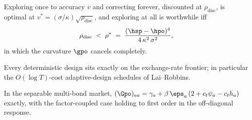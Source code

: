 \begin{theorem}
Exploring once to accuracy $v$ and correcting forever, discounted at
$\rho_{\mathrm{disc}}$, is optimal at
$v^{*} = (\sigma/\kappa)\sqrt{\rho_{\mathrm{disc}}}$, and exploring at all
is worthwhile iff
\[
\rho_{\mathrm{disc}} \;<\; \rho^{*} \;=\;
\frac{(\hsp - \hpo)^4}{4\,\kappa^2\,\sigma^2},
\]
in which the curvature $\gpo$ cancels completely.
\end{theorem}

\begin{proposition}
Every deterministic design sits exactly on the exchange-rate frontier; in
particular the $O(\log T)$-cost adaptive-design schedules of Lai--Robbins.
\end{proposition}

\begin{proposition}
In the separable multi-bond market,
$(\Gpo)_{aa} = \gamma_a + \beta\,\eps_a\,(2 + c_t\psi_a - c_t h_a)$
exactly, with the factor-coupled case holding to first order in the
off-diagonal response.
\end{proposition}

